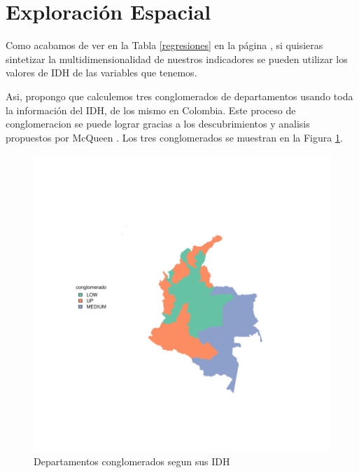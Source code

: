 \documentclass{article}
\begin{document}
\section{Exploración Espacial}

Como acabamos de ver en la Tabla \ref{regresiones} en la página \pageref{regresiones}, si quisieras sintetizar la multidimensionalidad de nuestros indicadores se pueden utilizar los valores de IDH de las variables que tenemos. 

Asi, propongo que calculemos tres conglomerados de departamentos usando toda la información del IDH, de los mismo en Colombia. Este proceso de conglomeracion se puede lograr gracias a los descubrimientos y analisis propuestos por McQueen \cite{macqueen_methods_nodate}. Los tres conglomerados se muestran en la Figura \ref{clustmap}.




\begin{figure}[h]
\includegraphics{ProyectoFinal-JD-plotMap1}

\caption{Departamentos conglomerados segun sus IDH}\label{clustmap}
\end{figure}
\clearpage



\renewcommand{\refname}{Bibliografia}

\end{document}
